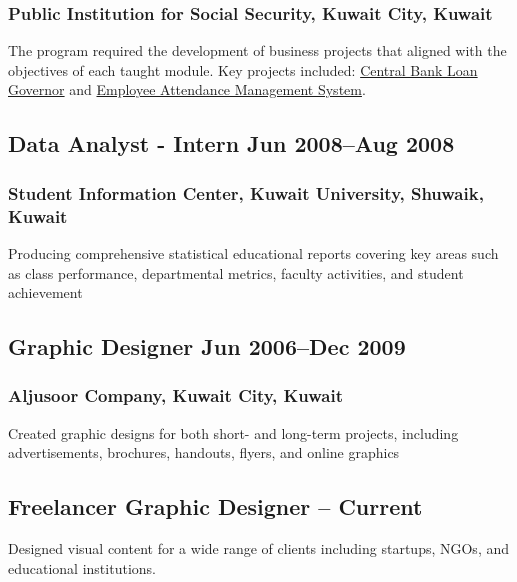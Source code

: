 \documentclass[11pt]{article}
\begin{document}
\subsubsection{Public Institution for Social Security, Kuwait City, Kuwait}
 \noindent
The program required the development of business projects that aligned with the objectives of each taught module. Key projects included: \hyperref[sec: pifss-Bank]{Central Bank Loan Governor} and \hyperref[sec: pifss-Attendance]{Employee Attendance Management System}.


\vspace{0.8em} %

\subsection{Data Analyst - Intern \hfill \normalfont Jun 2008–Aug 2008}  
\subsubsection{Student Information Center, Kuwait University, Shuwaik, Kuwait}
 \noindent Producing comprehensive statistical educational reports covering key areas such as class performance, departmental metrics, faculty activities, and student achievement

 \vspace{0.8em} %



\subsection{Graphic Designer \hfill \normalfont Jun 2006–Dec 2009}  
\subsubsection{Aljusoor Company, Kuwait City, Kuwait}
 \noindent Created graphic designs for both short- and long-term projects, including advertisements, brochures, handouts, flyers, and online graphics

\vspace{0.8em} %

\subsection{Freelancer Graphic Designer \hfill {} – Current}  
 \noindent Designed visual content for a wide range of clients including startups, NGOs, and educational institutions.
\end{document}
